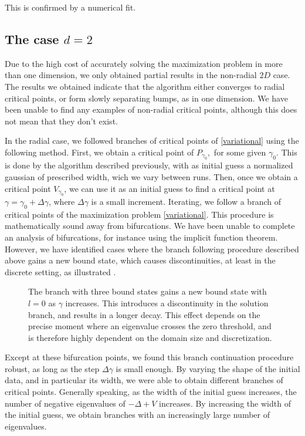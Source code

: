 \documentclass[10pt,a4paper,reqno]{amsart}
\begin{document}
This is confirmed by a numerical fit.

\subsection{The case $d = 2$}
Due to the high cost of accurately solving the maximization problem in
more than one dimension, we only obtained partial results in the
non-radial $2D$ case. The results we obtained indicate that the
algorithm either converges to radial critical points, or form slowly
separating bumps, as in one dimension. We have been unable to find any
examples of non-radial critical points, although this does not mean
that they don't exist.

In the radial case, we followed branches of critical points of
\eqref{variational} using the following method. First, we obtain a
critical point of $P_{\gamma_{0}},$ for some given $\gamma_{0}$. This
is done by the algorithm described previously, with as initial guess a
normalized gaussian of prescribed width, wich we vary between
runs. Then, once we obtain a critical point $V_{\gamma_{0}}$, we can
use it as an initial guess to find a critical point at $\gamma =
\gamma_{0} + \Delta \gamma$, where $\Delta \gamma$ is a small
increment. Iterating, we follow a branch of critical points of the
maximization problem \eqref{variational}. This procedure is
mathematically sound away from bifurcations. We have been unable to
complete an analysis of bifurcations, for instance using the implicit
function theorem. However, we have identified cases where the branch
following procedure described above gains a new bound state, which
causes discontinuities, at least in the discrete setting, as
illustrated .

\begin{figure}[H]
  \centering
  \caption{The branch with three bound states gains a new bound state
    with $l = 0$ as $\gamma$ increases. This introduces a
    discontinuity in the solution branch, and results in a longer
    decay. This effect depends on the precise moment where an
    eigenvalue crosses the zero threshold, and is therefore highly
    dependent on the domain size and discretization.}
  \label{fig:bifur}
\end{figure}

Except at these bifurcation points, we found this branch continuation
procedure robust, as long as the step $\Delta \gamma$ is small
enough. By varying the shape of the initial data, and in particular
its width, we were able to obtain different branches of critical
points. Generally speaking, as the width of the initial guess
increases, the number of negative eigenvalues of $-\Delta + V$
increases. By increasing the width of the initial guess, we obtain
branches with an increasingly large number of eigenvalues.
\end{document}
